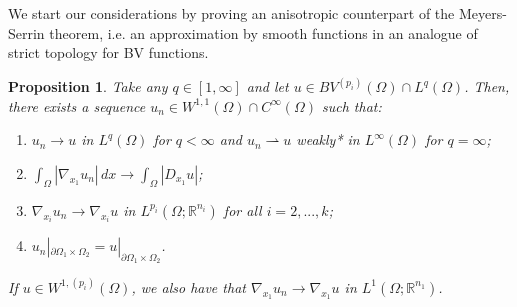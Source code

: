 \documentclass[reqno,12pt]{amsart}
\newtheorem{proposition}[theorem]{Proposition}
\numberwithin{equation}{section}
\begin{document}
We start our considerations by proving an anisotropic counterpart of the Meyers-Serrin theorem, i.e. an approximation by smooth functions in an analogue of strict topology for BV functions.

\begin{proposition}\label{prop:meyersserrin}
Take any $q \in [1,\infty]$ and let $u \in BV^{(p_i)}(\Omega) \cap L^q(\Omega)$. Then, there exists a sequence $u_n \in W^{1,1}(\Omega) \cap C^\infty(\Omega)$ such that:
\begin{enumerate}
\item $u_n \rightarrow u$ in $L^q(\Omega)$ for $q < \infty$ and $u_n \rightharpoonup u$ weakly* in $L^\infty(\Omega)$ for $q = \infty$;

\item $\int_\Omega |\nabla_{x_1} u_n| \, dx \rightarrow \int_{\Omega} |D_{x_1} u|$;

\item $\nabla_{x_i} u_n \rightarrow \nabla_{x_i} u$ in $L^{p_i}(\Omega; \mathbb{R}^{n_i})$ for all $i = 2,...,k$;

\item $u_n|_{\partial\Omega_1 \times \Omega_2} = u|_{\partial\Omega_1 \times \Omega_2}$.
\end{enumerate}
If $u \in W^{1,(p_i)}(\Omega)$, we also have that $\nabla_{x_1} u_n \rightarrow \nabla_{x_1} u$ in $L^{1}(\Omega; \mathbb{R}^{n_1})$.
\end{proposition}
\end{document}
